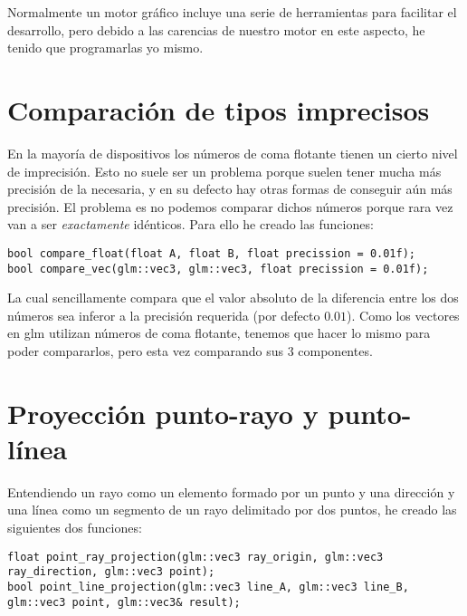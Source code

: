 Normalmente un motor gráfico incluye una serie de herramientas para facilitar el desarrollo, pero debido a las carencias de nuestro motor en este aspecto, he tenido que programarlas yo mismo.

\section{Comparación de tipos imprecisos}
En la mayoría de dispositivos los números de coma flotante tienen un cierto nivel de imprecisión. Esto no suele ser un problema porque suelen tener mucha más precisión de la necesaria, y en su defecto hay otras formas de conseguir aún más precisión. El problema es no podemos comparar dichos números porque rara vez van a ser \textit{exactamente} idénticos. Para ello he creado las funciones:

\begin{lstlisting}
bool compare_float(float A, float B, float precission = 0.01f);
bool compare_vec(glm::vec3, glm::vec3, float precission = 0.01f);
\end{lstlisting}

La cual sencillamente compara que el valor absoluto de la diferencia entre los dos números sea inferor a la precisión requerida (por defecto $0.01$). Como los vectores en glm utilizan números de coma flotante, tenemos que hacer lo mismo para poder compararlos, pero esta vez comparando sus 3 componentes.

\section{Proyección punto-rayo y punto-línea}
\label{sec:pointrayproj}
Entendiendo un rayo como un elemento formado por un punto y una dirección y una línea como un segmento de un rayo delimitado por dos puntos, he creado las siguientes dos funciones:

\begin{lstlisting}
float point_ray_projection(glm::vec3 ray_origin, glm::vec3 ray_direction, glm::vec3 point);
bool point_line_projection(glm::vec3 line_A, glm::vec3 line_B, glm::vec3 point, glm::vec3& result);
\end{lstlisting}

